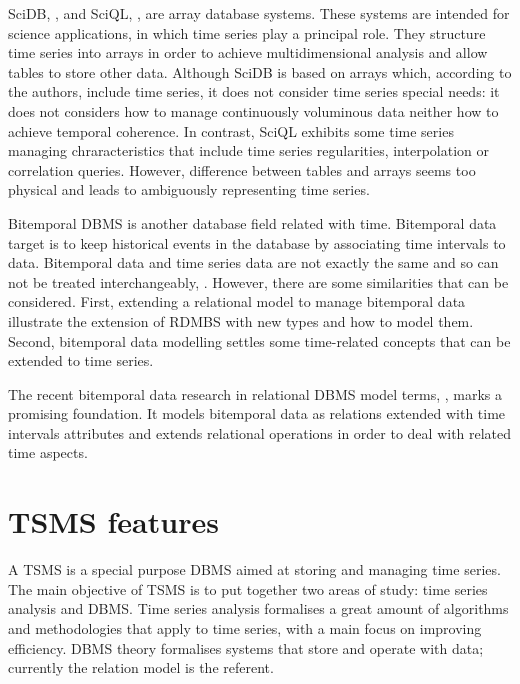 SciDB, \cite{stonebraker09:scidb}, and SciQL, \cite{zhang11}, are
array database systems. These systems are intended for science
applications, in which time series play a principal role. They
structure time series into arrays in order to achieve multidimensional
analysis and allow tables to store other data.  Although SciDB is
based on arrays which, according to the authors, include time series,
it does not consider time series special needs: it does not considers
how to manage continuously voluminous data neither how to achieve
temporal coherence.  In contrast, SciQL exhibits some time series
managing chraracteristics that include time series regularities,
interpolation or correlation queries.  However, difference between
tables and arrays seems too physical and leads to ambiguously
representing time series.

Bitemporal DBMS is another database field related with
time. Bitemporal data target is to keep historical events in the
database by associating time intervals to data.  Bitemporal data and
time series data are not exactly the same and so can not be treated
interchangeably, \cite{schmidt95}. However, there are some
similarities %
that can be considered. First, extending a relational model to manage
bitemporal data illustrate the extension of RDMBS with new types and
how to model them. Second, bitemporal data modelling settles some
time-related concepts that can be extended to time series.

The recent bitemporal data research in relational DBMS model terms,
\cite{date02:_tempor_data_relat_model}, marks a promising
foundation. It models bitemporal data as relations extended with time
intervals attributes and extends relational operations in order to
deal with related time aspects.





\section{TSMS features}
\label{sec:tsms-features}

A TSMS is a special purpose DBMS aimed at storing and managing time
series. The main objective of TSMS is to put together two areas of
study: time series analysis and DBMS.  Time series analysis formalises
a great amount of algorithms and methodologies that apply to time
series, with a main focus on improving efficiency. DBMS theory
formalises systems that store and operate with data; currently the
relation model \cite{date:introduction} is the referent.

